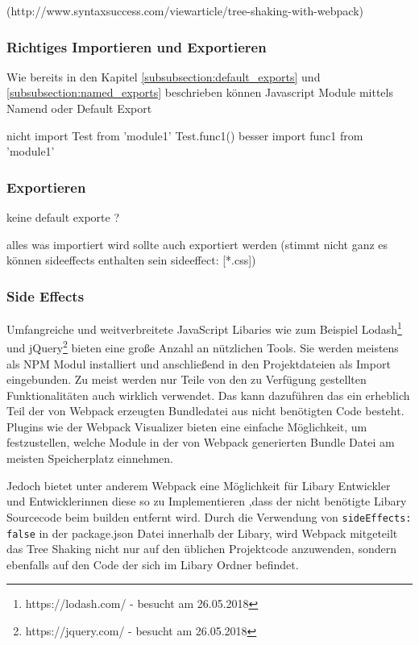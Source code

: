 (http://www.syntaxsuccess.com/viewarticle/tree-shaking-with-webpack)

\subsubsection{Richtiges Importieren und Exportieren}

Wie bereits in den Kapitel \ref{subsubsection:default_exports} und \ref{subsubsection:named_exports} beschrieben können Javascript Module mittels Namend oder Default Export

nicht
	import Test from 'module1'
    Test.func1()
besser 
	import {func1} from 'module1'

\subsubsection{Exportieren}
keine default exporte ?

alles was importiert wird sollte auch exportiert werden (stimmt nicht ganz es können sideeffects enthalten sein sideeffect: [*.css])

\subsubsection{Side Effects}
\label{subsubsection:side_effects}
Umfangreiche und weitverbreitete JavaScript Libaries wie zum Beispiel Lodash\footnote{https://lodash.com/ - besucht am 26.05.2018} und jQuery\footnote{https://jquery.com/ - besucht am 26.05.2018} bieten eine große Anzahl an nützlichen Tools. Sie werden meistens als NPM Modul installiert und anschließend in den Projektdateien als Import eingebunden. Zu meist werden nur Teile von den zu Verfügung gestellten Funktionalitäten auch wirklich verwendet. Das kann dazuführen das ein erheblich Teil der von Webpack erzeugten Bundledatei aus nicht benötigten Code besteht. Plugins wie der Webpack Visualizer bieten eine einfache Möglichkeit, um festzustellen, welche Module in der von Webpack generierten Bundle Datei am meisten Speicherplatz einnehmen.

Jedoch bietet unter anderem Webpack eine Möglichkeit für Libary Entwickler und Entwicklerinnen diese so zu Implementieren ,dass der nicht benötigte Libary Sourcecode beim builden entfernt wird.
Durch die Verwendung von \lstinline{sideEffects: false} in der package.json Datei innerhalb der Libary, wird Webpack mitgeteilt das Tree Shaking nicht nur auf den üblichen Projektcode anzuwenden, sondern ebenfalls auf den Code der sich im Libary Ordner befindet.

